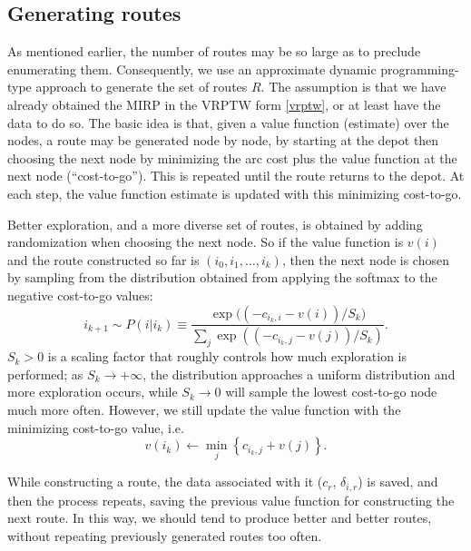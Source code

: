 \documentclass[11pt]{article}
\theoremstyle{definition}
\newcommand{\set}[1]{\left\{ #1 \right\}}
\newcommand{\smallsum}{{\textstyle{\sum}}}
\newcommand{\0}{\mathbf{0}}
\begin{document}
\subsection{Generating routes}

As mentioned earlier, the number of routes may be so large as to preclude enumerating them.
Consequently, we use an approximate dynamic programming-type approach to generate the set of routes $R$.
The assumption is that we have already obtained the MIRP in the VRPTW form \eqref{vrptw}, or at least have the data to do so.
The basic idea is that, given a value function (estimate) over the nodes, a route may be generated node by node, by starting at the depot then choosing the next node by minimizing the arc cost plus the value function at the next node (``cost-to-go'').
This is repeated until the route returns to the depot.
At each step, the value function estimate is updated with this minimizing cost-to-go.

Better exploration, and a more diverse set of routes, is obtained by adding randomization when choosing the next node.
So if the value function is $v(i)$ and the route constructed so far is $(i_0,i_1,\dots, i_k)$, then the next node is chosen by sampling from the distribution obtained from applying the softmax to the negative cost-to-go values:
\[
i_{k+1} \sim P(i | i_k) \equiv \frac{\exp\big( (-c_{i_k,i} - v(i))/S_k \big)}{\smallsum_j \exp((-c_{i_k,j} - v(j))/S_k)}.
\]
$S_k > 0$ is a scaling factor that roughly controls how much exploration is performed;
as $S_k \to +\infty$, the distribution approaches a uniform distribution and more exploration occurs,
while $S_k \to 0$ will sample the lowest cost-to-go node much more often.
However, we still update the value function with the minimizing cost-to-go value, i.e. 
\[
	v(i_k) \gets \min_j \set{ c_{i_k,j} + v(j) }.
\]

While constructing a route, the data associated with it ($c_r$, $\delta_{i,r}$) is saved, and then the process repeats, saving the previous value function for constructing the next route.
In this way, we should tend to produce better and better routes, without repeating previously generated routes too often.



\end{document}
